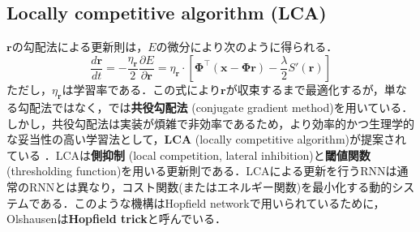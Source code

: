 \subsection{ Locally competitive algorithm (LCA) }
$\mathbf{r}$の勾配法による更新則は，$E$の微分により次のように得られる．
\begin{equation}
\frac{d \mathbf{r}}{dt}= -\frac{\eta_\mathbf{r}}{2}\frac{\partial E}{\partial \mathbf{r}}=\eta_\mathbf{r} \cdot\left[\mathbf{\Phi}^\top (\mathbf{x}-\mathbf{\Phi}\mathbf{r})- \frac{\lambda}{2}S'\left(\mathbf{r}\right)\right]
\end{equation}
ただし，$\eta_{\mathbf{r}}$は学習率である．この式により$\mathbf{r}$が収束するまで最適化するが，単なる勾配法ではなく，\citep{Olshausen1996-xe}では\textbf{共役勾配法} (conjugate gradient method)を用いている．しかし，共役勾配法は実装が煩雑で非効率であるため，より効率的かつ生理学的な妥当性の高い学習法として，\textbf{LCA}  (locally competitive algorithm)が提案されている \citep{Rozell2008-wp}．LCAは\textbf{側抑制} (local competition, lateral inhibition)と\textbf{閾値関数} (thresholding function)を用いる更新則である．LCAによる更新を行うRNNは通常のRNNとは異なり，コスト関数(またはエネルギー関数)を最小化する動的システムである．このような機構はHopfield networkで用いられているために，Olshausenは\textbf{Hopfield trick}と呼んでいる．
